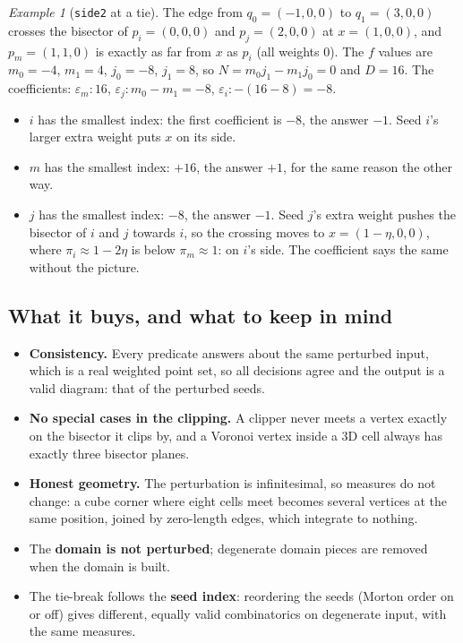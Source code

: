 \documentclass[11pt,a4paper]{article}
\newcommand{\code}[1]{\texttt{#1}}
\theoremstyle{definition}
\theoremstyle{remark}
\newtheorem*{example}{Example}
\begin{document}
\begin{example}[\code{side2} at a tie]
The edge from $q_0 = (-1,0,0)$ to $q_1 = (3,0,0)$ crosses the bisector of $p_i = (0,0,0)$ and
$p_j = (2,0,0)$ at $x = (1,0,0)$, and $p_m = (1,1,0)$ is exactly as far from $x$ as $p_i$ (all
weights 0). The $f$ values are $m_0 = -4$, $m_1 = 4$, $j_0 = -8$, $j_1 = 8$, so $N = m_0j_1 - m_1j_0
= 0$ and $D = 16$. The coefficients: $\varepsilon_m\colon 16$, $\varepsilon_j\colon m_0 - m_1 = -8$,
$\varepsilon_i\colon -(16 - 8) = -8$.
\begin{itemize}
  \item $i$ has the smallest index: the first coefficient is $-8$, the answer $-1$. Seed $i$'s
    larger extra weight puts $x$ on its side.
  \item $m$ has the smallest index: $+16$, the answer $+1$, for the same reason the other way.
  \item $j$ has the smallest index: $-8$, the answer $-1$. Seed $j$'s extra weight pushes the
    bisector of $i$ and $j$ towards $i$, so the crossing moves to $x = (1 - \eta, 0, 0)$, where
    $\pi_i \approx 1 - 2\eta$ is below $\pi_m \approx 1$: on $i$'s side. The coefficient says the
    same without the picture.
\end{itemize}
\end{example}

\subsection{What it buys, and what to keep in mind}\label{ssec:sosbuys}

\begin{itemize}
  \item \textbf{Consistency.} Every predicate answers about the same perturbed input, which is a
    real weighted point set, so all decisions agree and the output is a valid diagram: that of the
    perturbed seeds.
  \item \textbf{No special cases in the clipping.} A clipper never meets a vertex exactly on the
    bisector it clips by, and a Voronoi vertex inside a 3D cell always has exactly three bisector
    planes.
  \item \textbf{Honest geometry.} The perturbation is infinitesimal, so measures do not change: a
    cube corner where eight cells meet becomes several vertices at the same position, joined by
    zero-length edges, which integrate to nothing.
  \item The \textbf{domain is not perturbed}; degenerate domain pieces are removed when the domain
    is built.
  \item The tie-break follows the \textbf{seed index}: reordering the seeds (Morton order on or
    off) gives different, equally valid combinatorics on degenerate input, with the same measures.
\end{itemize}
\end{document}
